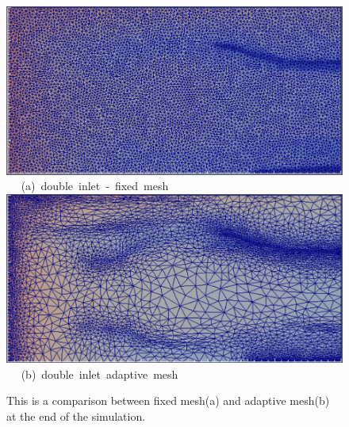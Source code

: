 \begin{landscape}
\begin{figure}[ht] 
\vbox{
\hbox{\hspace{3.5cm}
\includegraphics[width=.8\textwidth]{./Pics1/5reg_dinlet_fixed_end.pdf} 
}
\vspace{0.0cm}
\hbox{\hspace{6.5cm} (a) double inlet - fixed mesh   
}
\hbox{\hspace{3.5cm}
\includegraphics[width=.8\textwidth]{./Pics1/5reg_dinlet_adapt_end.pdf}
}
\vspace{0.0cm}
\hbox{\hspace{6.5cm} (b) double inlet adaptive mesh   
}
}     
\caption{This is a comparison between fixed mesh(a) and adaptive mesh(b) at the end of the simulation.}
\label{fig:3testcase_d}
\end{figure}
\end{landscape}
\clearpage

